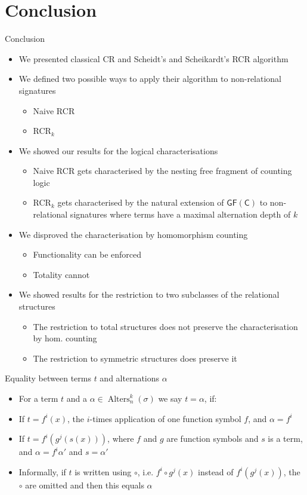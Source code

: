\documentclass[aspectratio=169]{beamer}
\newcommand{\GFC}{\mathsf{GF}(\mathsf{C})}
\begin{document}
	\section{Conclusion}
	
	\begin{frame}{Conclusion}
		\begin{itemize}
			\item We presented classical CR and Scheidt's and Scheikardt's RCR algorithm
			\item We defined two possible ways to apply their algorithm to non-relational signatures
			\begin{itemize}
				\item Naive RCR
				\item RCR$_k$
			\end{itemize}
			\item We showed our results for the logical characterisations
			\begin{itemize}
				\item Naive RCR gets characterised by the nesting free fragment of counting logic
				\item RCR$_k$ gets characterised by the natural extension of $\GFC$ to non-relational signatures where terms have a maximal alternation depth of $k$
			\end{itemize}
			\item We disproved the characterisation by homomorphism counting
			\begin{itemize}
				\item Functionality can be enforced
				\item Totality cannot
			\end{itemize}
			\item We showed results for the restriction to two subclasses of the relational structures
			\begin{itemize}
				\item The restriction to total structures does not preserve the characterisation by hom. counting
				\item The restriction to symmetric structures does preserve it
			\end{itemize}
		\end{itemize}
	\end{frame}
	
	\appendix
	
	\begin{frame}{Equality between terms $t$ and alternations $\alpha$}
		\begin{itemize}
			\item For a term $t$ and a $\alpha\in\operatorname{Alters}^k_n(\sigma)$ we say $t=\alpha$, if:
			\item If $t=f^i(x)$, the $i$-times application of one function symbol $f$, and $\alpha=f^i$
			\item If $t=f^i(g^j(s(x)))$, where $f$ and $g$ are function symbols and $s$ is a term, and $\alpha=f^i\alpha'$ and $s=\alpha'$
			\item Informally, if $t$ is written using $\circ$, i.e. $f^i\circ g^j(x)$ instead of $f^i(g^j(x))$, the $\circ$ are omitted and then this equals $\alpha$
		\end{itemize}
	\end{frame}
	
\end{document}

